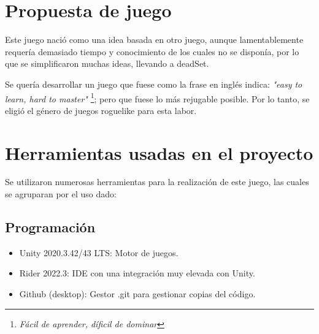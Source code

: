 \documentclass[12pt]{article}
\begin{document}
\tableofcontents
\newpage

\listoffigures
\newpage


\section{Propuesta de juego}

    Este juego nació como una idea basada en otro juego, aunque lamentablemente requería demasiado tiempo y conocimiento de los cuales no se disponía, por lo que se simplificaron muchas ideas, llevando a \textunderscore deadSet. 

    Se quería desarrollar un juego que fuese como la frase en inglés indica: \textit{"easy to learn, hard to master"} \footnote{\textit{Fácil de aprender, díficil de dominar}}; pero que fuese lo más rejugable posible. Por lo tanto, se eligió el género de juegos roguelike para esta labor. 


\section{ Herramientas usadas en el proyecto}

    Se utilizaron numerosas herramientas para la realización de este juego, las cuales se agruparan por el uso dado:

    \subsection{Programación}
        \begin{itemize}
            \item Unity 2020.3.42/43 LTS: Motor de juegos.
            \item Rider 2022.3: IDE con una integración muy elevada con Unity. 
            \item Github (desktop): Gestor .git para gestionar copias del código.
        \end{itemize}
        
\end{document}
